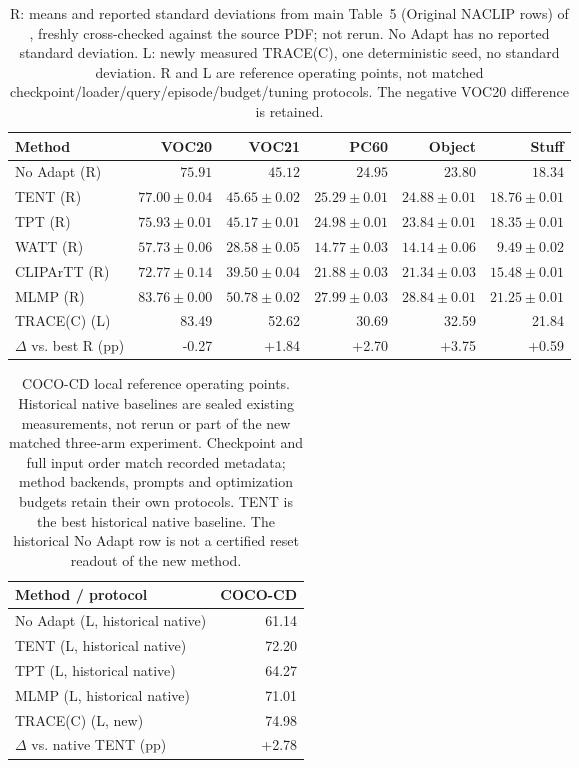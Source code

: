 \begin{table}[t]
\caption{R: means and reported standard deviations from main Table~5 (Original NACLIP rows) of \citet{noori2025mlmp}, freshly cross-checked against the source PDF; not rerun. No Adapt has no reported standard deviation. L: newly measured TRACE(C), one deterministic seed, no standard deviation. R and L are reference operating points, not matched checkpoint/loader/query/episode/budget/tuning protocols. The negative VOC20 difference is retained.}
\label{tab:image-full-reference}
\centering\small
\begin{tabular}{@{}lrrrrr@{}}
\toprule
Method & VOC20 & VOC21 & PC60 & Object & Stuff \\
\midrule
No Adapt (R) & $75.91$ & $45.12$ & $24.95$ & $23.80$ & $18.34$ \\
TENT (R) & $77.00 \pm 0.04$ & $45.65 \pm 0.02$ & $25.29 \pm 0.01$ & $24.88 \pm 0.01$ & $18.76 \pm 0.01$ \\
TPT (R) & $75.93 \pm 0.01$ & $45.17 \pm 0.01$ & $24.98 \pm 0.01$ & $23.84 \pm 0.01$ & $18.35 \pm 0.01$ \\
WATT (R) & $57.73 \pm 0.06$ & $28.58 \pm 0.05$ & $14.77 \pm 0.03$ & $14.14 \pm 0.06$ & $9.49 \pm 0.02$ \\
CLIPArTT (R) & $72.77 \pm 0.14$ & $39.50 \pm 0.04$ & $21.88 \pm 0.03$ & $21.34 \pm 0.03$ & $15.48 \pm 0.01$ \\
MLMP (R) & $83.76 \pm 0.00$ & $50.78 \pm 0.02$ & $27.99 \pm 0.03$ & $28.84 \pm 0.01$ & $21.25 \pm 0.01$ \\
\midrule
TRACE(C) (L) & 83.49 & 52.62 & 30.69 & 32.59 & 21.84 \\
$\Delta$ vs. best R (pp) & -0.27 & +1.84 & +2.70 & +3.75 & +0.59 \\
\bottomrule
\end{tabular}
\end{table}
\begin{table}[t]
\caption{COCO-CD local reference operating points. Historical native baselines are sealed existing measurements, not rerun or part of the new matched three-arm experiment. Checkpoint and full input order match recorded metadata; method backends, prompts and optimization budgets retain their own protocols. TENT is the best historical native baseline. The historical No Adapt row is not a certified reset readout of the new method.}
\label{tab:image-full-cd-reference}
\centering\small
\begin{tabular}{@{}lr@{}}
\toprule
Method / protocol & COCO-CD \\
\midrule
No Adapt (L, historical native) & 61.14 \\
TENT (L, historical native) & 72.20 \\
TPT (L, historical native) & 64.27 \\
MLMP (L, historical native) & 71.01 \\
\midrule
TRACE(C) (L, new) & 74.98 \\
$\Delta$ vs. native TENT (pp) & +2.78 \\
\bottomrule
\end{tabular}
\end{table}
